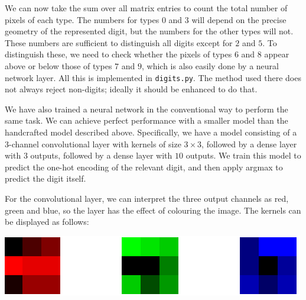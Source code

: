 \documentclass{amsart}
\renewcommand{\:}{\colon}
\theoremstyle{definition}
\begin{document}
We can now take the sum over all matrix entries to count the total
number of pixels of each type.  The numbers for types $0$ and $3$
will depend on the precise geometry of the represented digit, but the
numbers for the other types will not.  These numbers are sufficient
to distinguish all digits except for $2$ and $5$.  To distinguish
these, we need to check whether the pixels of types $6$ and $8$
appear above or below those of types $7$ and $9$, which is also
easily done by a neural network layer.  All this is implemented in
\texttt{digits.py}.  The method used there does not always
reject non-digits; ideally it should be enhanced to do that.

We have also trained a neural network in the conventional way to
perform the same task.  We can achieve perfect performance with a
smaller model than the handcrafted model described above.
Specifically, we have a model consisting of a $3$-channel
convolutional layer with kernels of size $3\times 3$, followed by a
dense layer with $3$ outputs, followed by a dense layer with $10$
outputs.  We train this model to predict the one-hot encoding of the
relevant digit, and then apply argmax to predict the digit itself.

For the convolutional layer, we can interpret the three output
channels as red, green and blue, so the layer has the effect of
colouring the image.  The kernels can be displayed as follows:
\begin{center}
 \includegraphics[scale=0.5]{digit_kernels.png}
\end{center}
\end{document}
